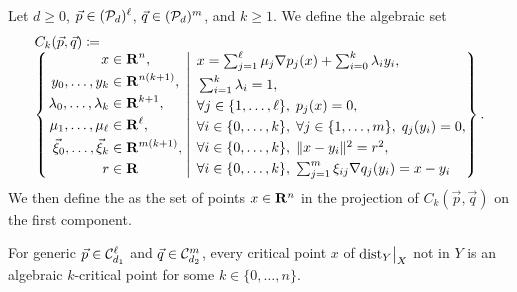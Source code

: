 \begin{definition}
\label{E!D:algebraic-critical-points}
  Let $d \geq 0$, $\vec{p} \in (\mathcal{P}_d)^\ell$, $\vec{q} \in (\mathcal{P}_d)^m$, and $k \geq 1$. We define the algebraic set
  \[
  \begin{array}{l}
    C_k(\vec{p}, \vec{q}) \coloneq \\
    \left\{
      \left.
      \begin{aligned}
        x & \in \mathbf{R}^n, \\
        y_0, \ldots, y_k & \in \mathbf{R}^{n(k + 1)}, \\
        \lambda_0, \ldots, \lambda_k & \in \mathbf{R}^{k + 1}, \\
        \mu_1, \ldots, \mu_\ell & \in \mathbf{R}^\ell, \\
        \vec{\xi}_0, \ldots, \vec{\xi}_k & \in \mathbf{R}^{m(k + 1)}, \\
        r & \in \mathbf{R}
      \end{aligned}
      \; \right| \;
      \begin{aligned}
        & \textstyle x = \sum_{j = 1}^\ell \mu_j \nabla p_j(x) + \sum_{i = 0}^k \lambda_i y_i, \\
        & \textstyle \sum_{i = 1}^k \lambda_i = 1, \\
        & \textstyle \forall j \in \{1, \ldots, \ell\}, \; p_j(x) = 0, \\
        & \textstyle \forall i \in \{0, \ldots, k\}, \; \forall j \in \{1, \ldots, m\}, \; q_j(y_i) = 0, \\
        & \textstyle \forall i \in \{0, \ldots, k\}, \; \|x - y_i\|^2 = r^2, \\
        & \textstyle \forall i \in \{0, \ldots, k\}, \; \sum_{j = 1}^m \xi_{ij} \nabla q_j(y_i) = x - y_i
      \end{aligned}
    \right\}.
  \end{array}
\]
We then define the  as the set of points $x \in \mathbf{R}^n$ in the projection of $C_k(\vec{p}, \vec{q})$ on the first component.
\end{definition}

\begin{lemma}
\label{E!L:algebraic-critical-points}
  For generic $\vec{p} \in \mathcal{C}_{d_1}^\ell$ and $\vec{q} \in \mathcal{C}_{d_2}^m$, every critical point $x$ of $\mathord{\operatorname{dist}}_Y\big|_X$ not in $Y$ is an algebraic $k$-critical point for some $k \in \{0, \ldots, n\}$.
\end{lemma}

